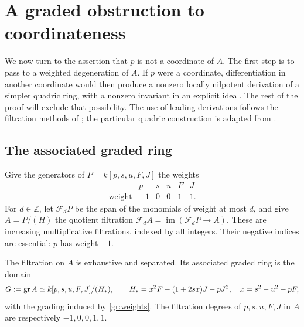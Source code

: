 \section{A graded obstruction to coordinateness}
\label{sec:filtration}

We now turn to the assertion that $p$ is not a coordinate of $A$.
The first step is to pass to a weighted degeneration of $A$.
If $p$ were a coordinate, differentiation in another coordinate would
then produce a nonzero locally nilpotent derivation of a simpler
quadric ring, with a nonzero invariant in an explicit ideal.
The rest of the proof will exclude that possibility.
The use of leading derivations follows the filtration methods of
\cite[Sections~3--5]{KalimanMakarLimanov2007}; the particular quadric construction is
adapted from \cite[Sections~3--5]{Cancellation2026}.

\subsection{The associated graded ring}

Give the generators of $P=k[p,s,u,F,J]$ the weights
\begin{equation}
\label{gr:weights}
\begin{array}{c|rrrrr}
  &p&s&u&F&J\\ \hline
 \text{weight}&-1&0&0&1&1.
\end{array}
\end{equation}
For $d\in\mathbb Z$, let $\mathcal F_dP$ be the span of the monomials
of weight at most $d$, and give $A=P/(H)$ the quotient filtration
$\mathcal F_dA=\operatorname{im}(\mathcal F_dP\to A)$.
These are increasing multiplicative filtrations, indexed by all
integers.  Their negative indices are essential: $p$ has weight $-1$.

\begin{proposition}
\label{prop:graded}
The filtration on $A$ is exhaustive and separated.  Its associated
graded ring is the domain
\begin{equation}
\label{gr:presentation}
 G:=\operatorname{gr} A
 \simeq k[p,s,u,F,J]/(H_*),
 \qquad
 H_*=x^2F-(1+2sx)J-pJ^2,
 \quad x=s^2-u^2+pF,
\end{equation}
with the grading induced by \eqref{gr:weights}.
The filtration degrees of $p,s,u,F,J$ in $A$ are respectively
$-1,0,0,1,1$.
\end{proposition}

